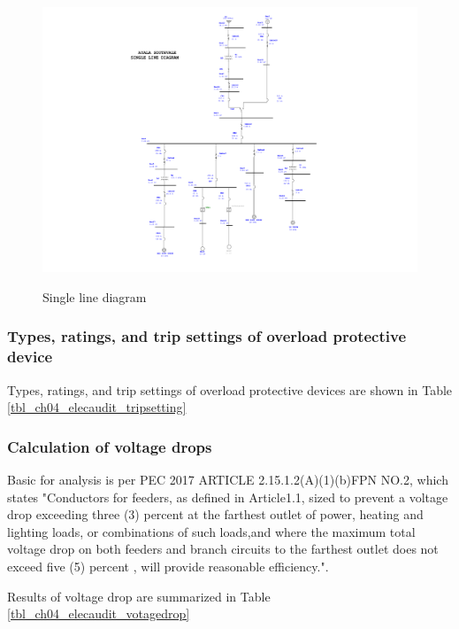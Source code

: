 \begin{figure}
	\includegraphics[width=\textwidth]{figures/fig_ch04_elecaudit_SLD_with_VFD.pdf} \\
	\caption{Single line diagram}
	\label{fig_ch04_elecaudit_SLD_with_VFD}
\end{figure}
\subsubsection{Types, ratings, and trip settings of overload protective device}
Types, ratings, and trip settings of overload protective devices are shown in Table \ref{tbl_ch04_elecaudit_tripsetting}





\subsubsection{Calculation of voltage drops }
Basic for analysis is per PEC 2017 ARTICLE 2.15.1.2(A)(1)(b)FPN NO.2, which states "Conductors  for feeders, as defined in Article1.1, sized to prevent a voltage drop exceeding three
(3) percent at the farthest outlet of power, heating and lighting loads, or combinations of such
loads,and where the maximum total voltage drop on both feeders and branch circuits to the
farthest outlet does not exceed five (5) percent , will provide reasonable efficiency.".

Results of voltage drop are summarized in Table \ref{tbl_ch04_elecaudit_votagedrop}



